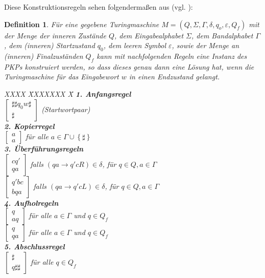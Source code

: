 \documentclass[]{scrartcl}
\newtheorem{definition}{Definition}[section]
\begin{document}
			Diese Konstruktionsregeln sehen folgendermaßen aus (vgl. \cite{wegener}):
			\begin{definition}
				\label{def-simulation}
				Für eine gegebene Turingmaschine $M = (Q, \Sigma, \varGamma, \delta, q_o, \varepsilon ,Q_f)$ mit der Menge der inneren Zustände $Q$, dem Eingabealphabet $\Sigma$, dem Bandalphabet $\varGamma$, dem (inneren) Startzustand $q_0$, dem leeren Symbol $\varepsilon$, sowie der Menge an (inneren) Finalzuständen $Q_f$ kann mit nachfolgenden Regeln eine Instanz des PKPs konstruiert werden, so dass dieses genau dann eine Lösung hat, wenn die Turingmaschine für das Eingabewort $w$ in einen Endzustand gelangt.
				\begin{tabbing}
					XXXX \= XXXXXXX \= X \kill
						\textbf{1. Anfangsregel}\\
							\> \textbullet $\begin{bmatrix}\sharp\sharp q_0w\sharp \\ \sharp\end{bmatrix}$ \> (Startwortpaar)\\
						\textbf{2. Kopierregel}\\
							\> \textbullet$\begin{bmatrix} a \\ a \end{bmatrix}$ \> für alle $a \in \varGamma \cup \left\lbrace \sharp \right\rbrace$\\
						\textbf{3. Überführungsregeln}\\
							\> \textbullet$\begin{bmatrix} cq' \\ qa \end{bmatrix}$ \> falls $(qa \rightarrow q'cR) \in \delta$, für $q \in Q, a \in \varGamma$ \\
							\> \textbullet$\begin{bmatrix} q'bc \\ bqa \end{bmatrix}$ \> falls $(qa \rightarrow q'cL) \in \delta$, für $q \in Q, a \in \varGamma$\\
						\textbf{4. Aufholregeln}\\
							\> \textbullet$\begin{bmatrix} q \\ aq \end{bmatrix}$ \> für alle $a \in \varGamma$ und $q \in Q_f$\\
							\> \textbullet$\begin{bmatrix} q \\ qa \end{bmatrix}$ \> für alle $a \in \varGamma$ und $q \in Q_f$\\
						\textbf{5. Abschlussregel}\\
							\> \textbullet$\begin{bmatrix} \sharp \\ q\sharp\sharp\end{bmatrix}$ \> für alle $q \in Q_f$

				\end{tabbing} 
			\end{definition}
\end{document}
